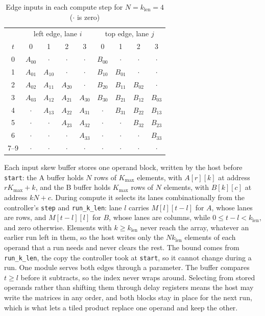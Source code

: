 \begin{table}[t]
\centering
\caption{Edge inputs in each compute step for $N = k_{\mathrm{len}} = 4$ ($\cdot$ is zero)}
\label{tab:skew}
\scriptsize
\setlength{\tabcolsep}{3.2pt}
\begin{tabular}{@{}c|cccc|cccc@{}}
\toprule
 & \multicolumn{4}{c|}{left edge, lane $i$} & \multicolumn{4}{c}{top edge, lane $j$} \\
$t$ & 0 & 1 & 2 & 3 & 0 & 1 & 2 & 3 \\
\midrule
0 & $A_{00}$ & $\cdot$ & $\cdot$ & $\cdot$ & $B_{00}$ & $\cdot$ & $\cdot$ & $\cdot$ \\
1 & $A_{01}$ & $A_{10}$ & $\cdot$ & $\cdot$ & $B_{10}$ & $B_{01}$ & $\cdot$ & $\cdot$ \\
2 & $A_{02}$ & $A_{11}$ & $A_{20}$ & $\cdot$ & $B_{20}$ & $B_{11}$ & $B_{02}$ & $\cdot$ \\
3 & $A_{03}$ & $A_{12}$ & $A_{21}$ & $A_{30}$ & $B_{30}$ & $B_{21}$ & $B_{12}$ & $B_{03}$ \\
4 & $\cdot$ & $A_{13}$ & $A_{22}$ & $A_{31}$ & $\cdot$ & $B_{31}$ & $B_{22}$ & $B_{13}$ \\
5 & $\cdot$ & $\cdot$ & $A_{23}$ & $A_{32}$ & $\cdot$ & $\cdot$ & $B_{32}$ & $B_{23}$ \\
6 & $\cdot$ & $\cdot$ & $\cdot$ & $A_{33}$ & $\cdot$ & $\cdot$ & $\cdot$ & $B_{33}$ \\
7--9 & $\cdot$ & $\cdot$ & $\cdot$ & $\cdot$ & $\cdot$ & $\cdot$ & $\cdot$ & $\cdot$ \\
\bottomrule
\end{tabular}
\end{table}

Each input skew buffer stores one operand block, written by the host before \texttt{start}: the A buffer holds $N$ rows of $K_{\max}$ elements, with $A[r][k]$ at address $rK_{\max} + k$, and the B buffer holds $K_{\max}$ rows of $N$ elements, with $B[k][c]$ at address $kN + c$. During compute it selects its lanes combinationally from the controller's \texttt{step} and \texttt{run\_k\_len}: lane $l$ carries $M[l][t-l]$ for $A$, whose lanes are rows, and $M[t-l][l]$ for $B$, whose lanes are columns, while $0 \le t - l < k_{\mathrm{len}}$, and zero otherwise. Elements with $k \ge k_{\mathrm{len}}$ never reach the array, whatever an earlier run left in them, so the host writes only the $N k_{\mathrm{len}}$ elements of each operand that a run needs and never clears the rest. The bound comes from \texttt{run\_k\_len}, the copy the controller took at \texttt{start}, so it cannot change during a run. One module serves both edges through a parameter. The buffer compares $t \ge l$ before it subtracts, so the index never wraps around. Selecting from stored operands rather than shifting them through delay registers means the host may write the matrices in any order, and both blocks stay in place for the next run, which is what lets a tiled product replace one operand and keep the other.
